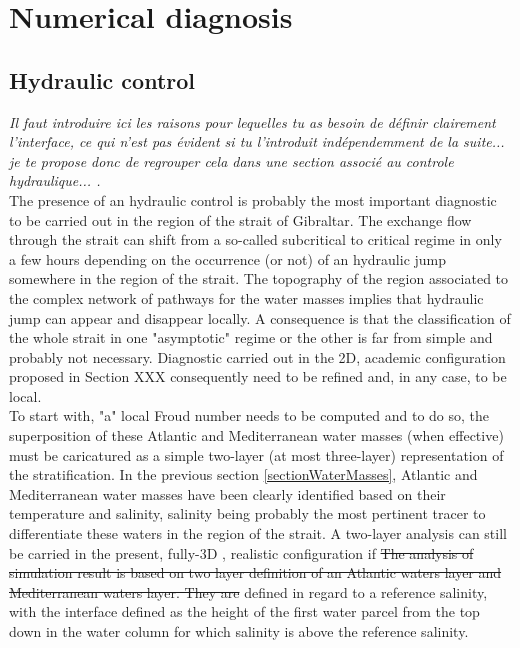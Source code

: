 \section{Numerical diagnosis}
\label{PartDiag3D}

\subsection{Hydraulic control}
\color{green} 
\textit{Il faut introduire ici les raisons pour lequelles tu as besoin de définir clairement l'interface, ce qui n'est pas évident si tu l'introduit indépendemment de la suite... je te propose donc de regrouper cela dans une section associé au controle hydraulique... .} \color{black}\\

\color{blue}The presence of an hydraulic control is probably the most important diagnostic to be carried out in the region of the strait of Gibraltar. The exchange flow through the strait can shift from a so-called subcritical to critical regime in only a few hours depending on the occurrence (or not) of an hydraulic jump somewhere in the region of the strait. The topography of the region associated to the complex network of pathways for the water masses implies that hydraulic jump can appear and disappear locally. A consequence is that the classification of the whole strait in one "asymptotic" regime or the other is far from simple and probably not necessary.
Diagnostic carried out in the 2D, academic configuration proposed in Section {XXX} consequently need to be refined and, in any case, to be local.\\
To start with, "a" local Froud number needs to be computed and to do so,  the superposition of these Atlantic and Mediterranean water masses (when effective) must be caricatured as a simple two-layer (at most three-layer) representation of the stratification.
In the previous section \ref{sectionWaterMasses}, Atlantic and Mediterranean water masses have been clearly identified based on their temperature and salinity, salinity being probably the most pertinent tracer to differentiate these waters in the region of the strait. 
A two-layer analysis can still be carried in the present, fully-3D , realistic configuration if
\color{black}
\sout{The analysis of simulation result is based on two layer definition of an Atlantic waters layer and Mediterranean waters layer. They are} defined in regard to a reference salinity, with the interface defined as the height of the first water parcel from the top down in the water column for which salinity is above the reference salinity.

